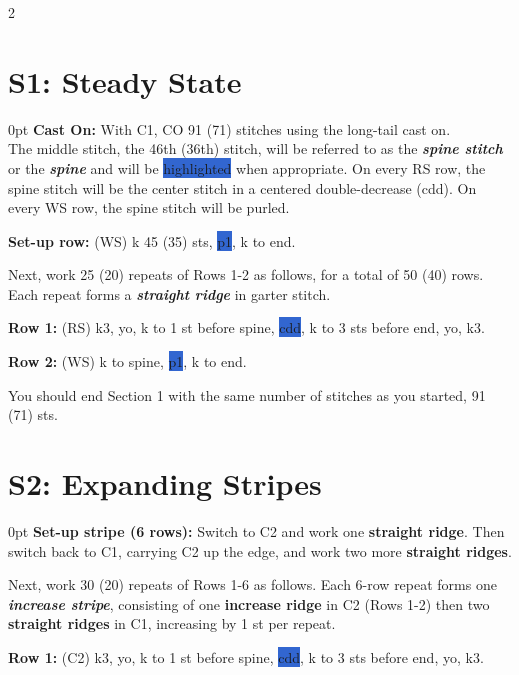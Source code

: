 \documentclass[12pt]{article}
\newcommand{\vocab}[1]{\emph{\textbf{#1}}} %
\newcommand{\rowDir}[1]{\hspace{-2em} \textbf{#1:}} %
\newcommand{\spine}[1]{\colorbox{highlight}{#1}} %
\newenvironment{frdirection}
    {%
	\def\FrameCommand{\fboxrule=\FrameRule\fboxsep=\FrameSep \fbox}
   	\MakeFramed {\advance\hsize-\width \FrameRestore}
    	\addmargin[2em]{0pt}}
    {\endaddmargin
	\endMakeFramed}
\newenvironment{unframed}
    {%
	\begin{addmargin}[1cm]{0pt}}
    {	\end{addmargin}}
\begin{document}
\newpage
\begin{multicols}{2}
\section*{S1: Steady State}

\begin{unframed}
\rowDir{Cast On} With C1, CO 91 (71) stitches using the long-tail cast on. \\ The middle stitch, the 46th (36th) stitch, will be referred to as the \vocab{spine stitch} or the \vocab{spine} and will be \spine{highlighted} when appropriate. On every RS row, the spine stitch will be the center stitch in a centered double-decrease (cdd). On every WS row, the spine stitch will be purled.
 
\rowDir{Set-up row} (WS) k 45 (35) sts, \spine{p1}, k to end. 
\end{unframed}

Next, work 25 (20) repeats of Rows 1-2 as follows, for a total of 50 (40) rows. Each repeat forms a \vocab{straight ridge} in garter stitch.

\begin{frdirection}
\rowDir{Row 1} (RS) k3, yo, k to 1 st before spine, \spine{cdd},  k to 3 sts before end, yo, k3.

\rowDir{Row 2} (WS) k to spine, \spine{p1}, k to end.
\end{frdirection}

You should end Section 1 with the same number of stitches as you started, 91 (71) sts.

\section*{S2: Expanding Stripes}
\begin{unframed}
\rowDir{Set-up stripe (6 rows)} Switch to C2 and work one \textbf{straight ridge}. Then switch back to C1, carrying C2 up the edge, and work two more \textbf{straight ridges}. 
\end{unframed}

Next, work 30 (20) repeats of Rows 1-6 as follows. Each 6-row repeat forms one \vocab{increase stripe}, consisting of one \textbf{increase ridge} in C2 (Rows 1-2) then two \textbf{straight ridges} in C1, increasing by 1 st per repeat. 

\begin{frdirection}
\rowDir{Row 1} (C2) k3, yo, k to 1 st before spine, \spine{cdd}, k to 3 sts before end, yo, k3.


\end{frdirection}
\end{multicols}
\end{document}
